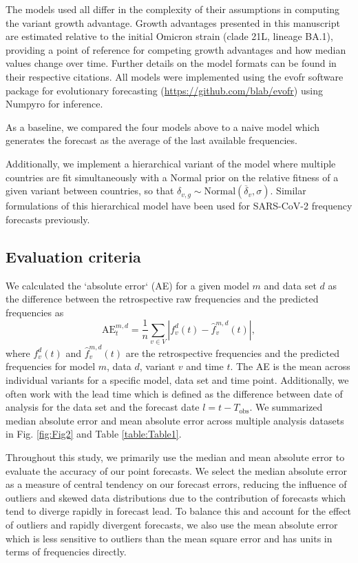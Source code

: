 The models used all differ in the complexity of their assumptions in computing the variant growth advantage.
Growth advantages presented in this manuscript are estimated relative to the initial Omicron strain (clade 21L, lineage BA.1), providing a point of reference for competing growth advantages and how median values change over time.
Further details on the model formats can be found in their respective citations.
All models were implemented using the evofr software package for evolutionary forecasting (\href{https://github.com/blab/evofr}{https://github.com/blab/evofr}) using Numpyro for inference.

As a baseline, we compared the four models above to a naive model which generates the forecast as the average of the last available frequencies.

Additionally, we implement a hierarchical variant of the model where multiple countries are fit simultaneously with a Normal prior on the relative fitness of a given variant between countries, so that $\delta_{v, g} \sim \text{Normal}(\overline{\delta}_{v}, \sigma)$.
Similar formulations of this hierarchical model have been used for SARS-CoV-2 frequency forecasts previously. \cite{susswein2023leveraging}

\subsection*{Evaluation criteria}

We calculated the `absolute error` (AE) for a given model $m$ and data set $d$ as the difference between the retrospective raw frequencies and the predicted frequencies as
\begin{equation}
    \mathrm{AE}_{t}^{m,d} = \frac{1}{n} \sum_{v \in V} \left|f_{v}^{d}(t) - \hat{f}^{m,d}_{v}(t) \right|,
\end{equation}
where $f_{v}^{d}(t)$ and $\hat{f}_{v}^{m,d}(t)$ are the retrospective frequencies and the predicted frequencies for model $m$, data $d$, variant $v$ and time $t$.
The AE is the mean across individual variants for a specific model, data set and time point.
Additionally, we often work with the lead time which is defined as the difference between date of analysis for the data set and the forecast date $l = t - T_{\text{obs}}$.
We summarized median absolute error and mean absolute error across multiple analysis datasets in Fig. \ref{fig:Fig2} and Table \ref{table:Table1}.

Throughout this study, we primarily use the median and mean absolute error to evaluate the accuracy of our point forecasts.
We select the median absolute error as a measure of central tendency on our forecast errors, reducing the influence of outliers and skewed data distributions due to the contribution of forecasts which tend to diverge rapidly in forecast lead.
To balance this and account for the effect of outliers and rapidly divergent forecasts, we also use the mean absolute error which is less sensitive to outliers than the mean square error and has units in terms of frequencies directly.

